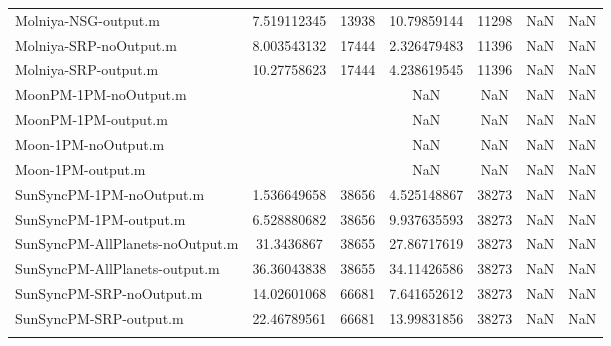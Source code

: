 \begin{table}[htbp!]
\begin{tabular}{lcccccc}
         Molniya-NSG-output.m & 7.519112345 & 13938 & 10.79859144 & 11298 & NaN & NaN \\
         Molniya-SRP-noOutput.m & 8.003543132 & 17444 & 2.326479483 & 11396 & NaN & NaN \\
         Molniya-SRP-output.m & 10.27758623 & 17444 & 4.238619545 & 11396 & NaN & NaN \\
         MoonPM-1PM-noOutput.m &  &  & NaN & NaN & NaN & NaN \\
         MoonPM-1PM-output.m &  &  & NaN & NaN & NaN & NaN \\
         Moon-1PM-noOutput.m &  &  & NaN & NaN & NaN & NaN \\
         Moon-1PM-output.m &  &  & NaN & NaN & NaN & NaN \\
         SunSyncPM-1PM-noOutput.m & 1.536649658 & 38656 & 4.525148867 & 38273 & NaN & NaN \\
         SunSyncPM-1PM-output.m & 6.528880682 & 38656 & 9.937635593 & 38273 & NaN & NaN \\
         SunSyncPM-AllPlanets-noOutput.m & 31.3436867 & 38655 & 27.86717619 & 38273 & NaN & NaN \\
         SunSyncPM-AllPlanets-output.m & 36.36043838 & 38655 & 34.11426586 & 38273 & NaN & NaN \\
         SunSyncPM-SRP-noOutput.m & 14.02601068 & 66681 & 7.641652612 & 38273 & NaN & NaN \\
         SunSyncPM-SRP-output.m & 22.46789561 & 66681 & 13.99831856 & 38273 & NaN & NaN \\
      \hline\hline
      \label{Table: Performance2} 
\end{tabular}
\end{table}
